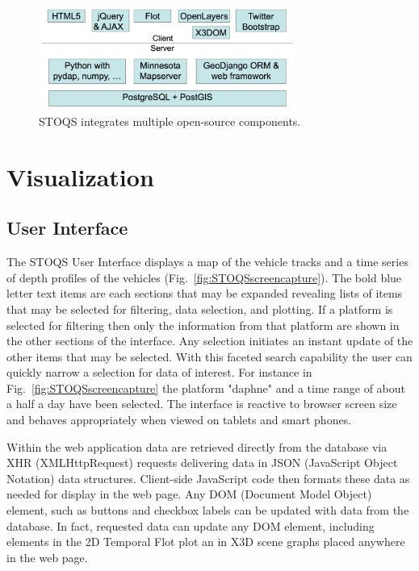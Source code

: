 \documentclass[conference]{IEEEtran}
\begin{document}
\begin{figure}[htbp]
\centering
\includegraphics[width=3.3in]{stoqs_arch_simple.png}
\caption{STOQS integrates multiple open-source components.}
\label{fig:STOQSArch}
\end{figure}


\section{Visualization}

\subsection{User Interface}

The STOQS User Interface displays a map of the vehicle tracks and a time series of depth profiles of the vehicles (Fig.~\ref{fig:STOQSscreencapture}). The bold blue letter text items are each sections that may be expanded revealing lists of items that may be selected for filtering, data selection, and plotting. If a platform is selected for filtering then only the information from that platform are shown in the other sections of the interface. Any selection initiates an instant update of the other items that may be selected. With this faceted search capability the user can quickly narrow a selection for data of interest. For instance in Fig.~\ref{fig:STOQSscreencapture} the platform "daphne"  and a time range of about a half a day have been selected. The interface is reactive to browser screen size and behaves appropriately when viewed on tablets and smart phones.

Within the web application data are retrieved directly from the database via XHR (XMLHttpRequest) requests delivering data in JSON (JavaScript Object Notation) data structures. Client-side JavaScript code then formats these data as needed for display in the web page. Any DOM (Document Model Object) element, such as buttons and checkbox labels can be updated with data from the database. In fact, requested data can update any DOM element, including elements in the 2D Temporal Flot plot an in  X3D scene graphs placed anywhere in the web page.
\end{document}

